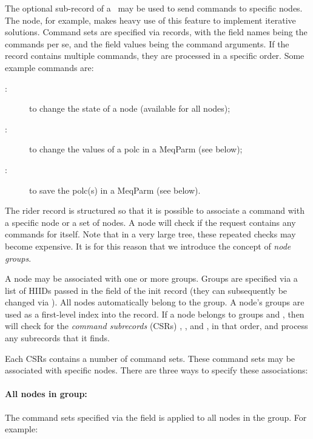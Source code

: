   The optional  sub-record of a \Request\ may be used to send
  commands to specific nodes. The  node, for example, makes heavy
  use of this feature to implement iterative solutions. Command sets are
  specified via records, with the field names being the commands per se, and
  the field values being the command arguments. If the record contains multiple
  commands, they are processed in a specific order. Some example commands are:

  \begin{description}
  
  \item[:] to change the state of a node (available for all nodes);
  
  \item[:] to change the values of a polc in a MeqParm (see
  below);
  
  \item[:] to save the polc(s) in a MeqParm (see below).
  
  \end{description}
  
  The rider record is structured so that it is possible to associate a command
  with a specific node or a set of nodes. A node will check if the request
  contains any commands for itself. Note that in a very large tree, these
  repeated checks may become expensive. It is for this reason that we introduce
  the concept of {\em node groups}. 
  
  A node may be associated with one or more groups. Groups are specified via a
  list of HIIDs passed in the  field of the init record (they
  can subsequently be changed via ). All nodes automatically
  belong to the  group. A node's groups are used as a first-level index
  into the  record. If a node belongs to groups  and
  , then  will check for the {\em command
  subrecords}\/ (CSRs) , , and , in
  that order, and process any subrecords that it finds.

  Each CSRs contains a number of command sets. These command sets may be
  associated with specific nodes. There are three ways to specify these
  associations:
  
  \paragraph{All nodes in group:} The command sets specified via the field
   is applied to all nodes in the group. For example:

